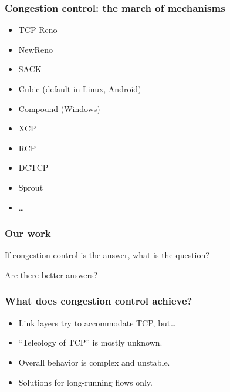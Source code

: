 \documentclass[svgnames]{beamer}
\begin{document}
\begin{frame}
\frametitle{Congestion control: the march of mechanisms}

\begin{itemize}

\item TCP Reno

\item NewReno

\item SACK

\item Cubic (default in Linux, Android)

\item Compound (Windows)

\item XCP

\item RCP

\item DCTCP

\item Sprout

\item \ldots

\end{itemize}

\end{frame}

\begin{frame}

\frametitle{Our work}

\large If congestion control is the answer, what is the question?

\vspace{\baselineskip}
\vspace{\baselineskip}
\vspace{\baselineskip}

\pause

\large Are there better answers?

\end{frame}

\begin{frame}
\frametitle{What does congestion control achieve?}

\begin{itemize}

\item Link layers try to accommodate TCP, but\ldots

\item ``Teleology of TCP'' is mostly unknown.

\item Overall behavior is complex and unstable.

\item Solutions for long-running flows only.

\end{itemize}

\end{frame}
\end{document}
